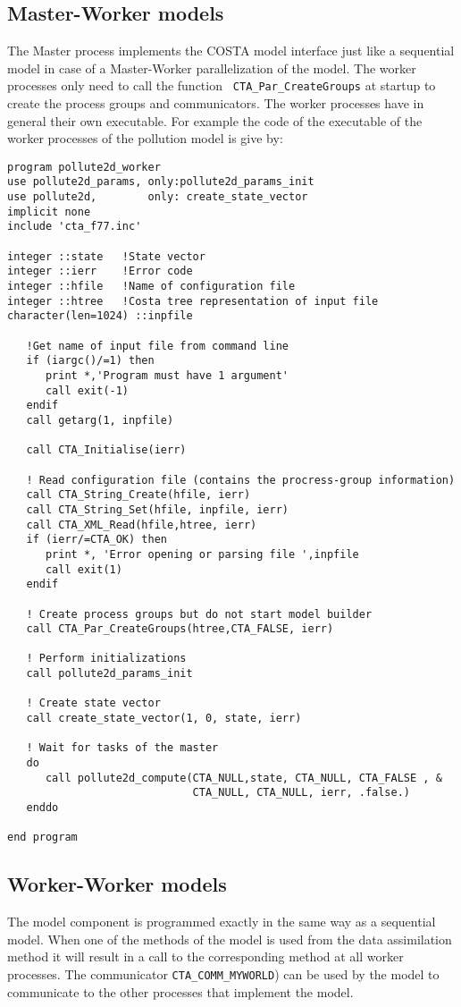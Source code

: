 \subsection{Master-Worker models}
The Master process implements the COSTA model interface just like a
sequential model in case of a Master-Worker parallelization of the model.
The worker processes only need to call the function {\tt
CTA\_Par\_CreateGroups} at startup to create the process groups and
communicators. The worker processes have in general their own executable.
For example the code of the executable of the worker processes of the
pollution model is give by:
\begin{verbatim}
program pollute2d_worker
use pollute2d_params, only:pollute2d_params_init
use pollute2d,        only: create_state_vector
implicit none
include 'cta_f77.inc'

integer ::state   !State vector
integer ::ierr    !Error code
integer ::hfile   !Name of configuration file
integer ::htree   !Costa tree representation of input file
character(len=1024) ::inpfile

   !Get name of input file from command line
   if (iargc()/=1) then
      print *,'Program must have 1 argument'
      call exit(-1)
   endif
   call getarg(1, inpfile)

   call CTA_Initialise(ierr)

   ! Read configuration file (contains the procress-group information)
   call CTA_String_Create(hfile, ierr)
   call CTA_String_Set(hfile, inpfile, ierr)
   call CTA_XML_Read(hfile,htree, ierr)
   if (ierr/=CTA_OK) then
      print *, 'Error opening or parsing file ',inpfile
      call exit(1)
   endif

   ! Create process groups but do not start model builder
   call CTA_Par_CreateGroups(htree,CTA_FALSE, ierr)

   ! Perform initializations
   call pollute2d_params_init

   ! Create state vector
   call create_state_vector(1, 0, state, ierr)

   ! Wait for tasks of the master
   do 
      call pollute2d_compute(CTA_NULL,state, CTA_NULL, CTA_FALSE , &
                             CTA_NULL, CTA_NULL, ierr, .false.)
   enddo

end program
\end{verbatim}


\subsection{Worker-Worker models}
The model component is programmed exactly in the same way as a sequential
model. When one of the methods of the model is used from the data
assimilation method it will result in a call to the corresponding method at
all worker processes. The communicator {\tt CTA\_COMM\_MYWORLD}) can be
used by the model to communicate to the other processes that implement the
model.



